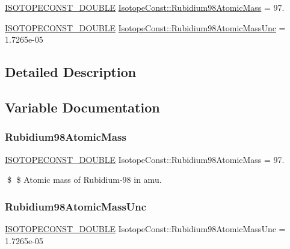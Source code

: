 \begin{DoxyCompactItemize}
\item 
\mbox{\hyperlink{group___isotope_const-_macros_ga8f45a7272ce02c0b4c65c44636ed719a}{I\+S\+O\+T\+O\+P\+E\+C\+O\+N\+S\+T\+\_\+\+D\+O\+U\+B\+LE}} \mbox{\hyperlink{group___isotope_const-_rubidium-_rb98_ga812925fd6fd4d7d59c0e5428479b8704}{Isotope\+Const\+::\+Rubidium98\+Atomic\+Mass}} = 97.
\item 
\mbox{\hyperlink{group___isotope_const-_macros_ga8f45a7272ce02c0b4c65c44636ed719a}{I\+S\+O\+T\+O\+P\+E\+C\+O\+N\+S\+T\+\_\+\+D\+O\+U\+B\+LE}} \mbox{\hyperlink{group___isotope_const-_rubidium-_rb98_ga5f25287b27522bdd7272bbcc8187588c}{Isotope\+Const\+::\+Rubidium98\+Atomic\+Mass\+Unc}} = 1.\+7265e-\/05
\end{DoxyCompactItemize}


\subsection{Detailed Description}


\subsection{Variable Documentation}
\mbox{\label{group___isotope_const-_rubidium-_rb98_ga812925fd6fd4d7d59c0e5428479b8704}} 
\subsubsection{\texorpdfstring{Rubidium98\+Atomic\+Mass}{Rubidium98AtomicMass}}
{\footnotesize\ttfamily \mbox{\hyperlink{group___isotope_const-_macros_ga8f45a7272ce02c0b4c65c44636ed719a}{I\+S\+O\+T\+O\+P\+E\+C\+O\+N\+S\+T\+\_\+\+D\+O\+U\+B\+LE}} Isotope\+Const\+::\+Rubidium98\+Atomic\+Mass = 97.}

\$ \$ Atomic mass of Rubidium-\/98 in amu. \mbox{\label{group___isotope_const-_rubidium-_rb98_ga5f25287b27522bdd7272bbcc8187588c}} 
\subsubsection{\texorpdfstring{Rubidium98\+Atomic\+Mass\+Unc}{Rubidium98AtomicMassUnc}}
{\footnotesize\ttfamily \mbox{\hyperlink{group___isotope_const-_macros_ga8f45a7272ce02c0b4c65c44636ed719a}{I\+S\+O\+T\+O\+P\+E\+C\+O\+N\+S\+T\+\_\+\+D\+O\+U\+B\+LE}} Isotope\+Const\+::\+Rubidium98\+Atomic\+Mass\+Unc = 1.\+7265e-\/05}

